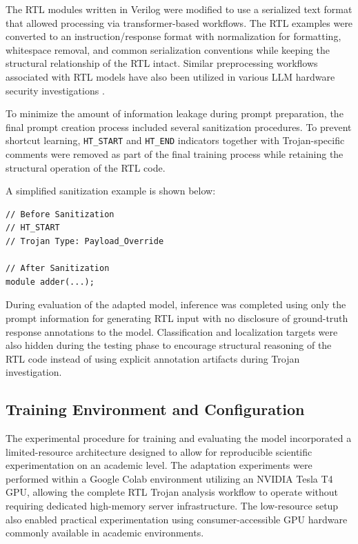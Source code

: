 \documentclass[conference]{IEEEtran}
\begin{document}
The RTL modules written in Verilog were modified to use a serialized text format that allowed processing via transformer-based workflows. The RTL examples were converted to an instruction/response format with normalization for formatting, whitespace removal, and common serialization conventions while keeping the structural relationship of the RTL intact. Similar preprocessing workflows associated with RTL models have also been utilized in various LLM hardware security investigations \cite{kundu2025pearl,trojanwhisper}.

To minimize the amount of information leakage during prompt preparation, the final prompt creation process included several sanitization procedures. To prevent shortcut learning, \texttt{HT\_START} and \texttt{HT\_END} indicators together with Trojan-specific comments were removed as part of the final training process while retaining the structural operation of the RTL code.

A simplified sanitization example is shown below:

\begin{verbatim}
// Before Sanitization
// HT_START
// Trojan Type: Payload_Override

// After Sanitization
module adder(...);
\end{verbatim}

During evaluation of the adapted model, inference was completed using only the prompt information for generating RTL input with no disclosure of ground-truth response annotations to the model. Classification and localization targets were also hidden during the testing phase to encourage structural reasoning of the RTL code instead of using explicit annotation artifacts during Trojan investigation.

\subsection{Training Environment and Configuration}
\label{subsec:training_environment}

The experimental procedure for training and evaluating the model incorporated a limited-resource architecture designed to allow for reproducible scientific experimentation on an academic level. The adaptation experiments were performed within a Google Colab environment utilizing an NVIDIA Tesla T4 GPU, allowing the complete RTL Trojan analysis workflow to operate without requiring dedicated high-memory server infrastructure. The low-resource setup also enabled practical experimentation using consumer-accessible GPU hardware commonly available in academic environments.
\end{document}

